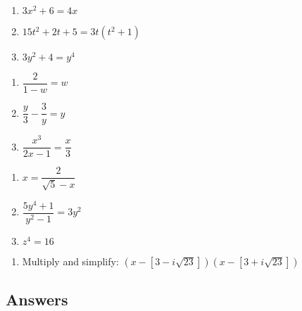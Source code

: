 \documentclass{ximera}
\begin{document}
\begin{multicols}{3}
\begin{enumerate}
\setcounter{enumi}{\value{HW}}

\item $3x^2 + 6 = 4x$ \label{solvecomplexfirst}
\item  $15t^2+2t+5= 3t(t^2+1)$
\item  $3y^2 + 4 = y^4$

\setcounter{HW}{\value{enumi}}
\end{enumerate}
\end{multicols}
\begin{multicols}{3}
\begin{enumerate}
\setcounter{enumi}{\value{HW}}

\item $\dfrac{2}{1-w}= w$ 
\item $\dfrac{y}{3} - \dfrac{3}{y} = y$ 
\item $\dfrac{x^3}{2x-1} = \dfrac{x}{3}$ 

\setcounter{HW}{\value{enumi}}
\end{enumerate}
\end{multicols}

\begin{multicols}{3}
\begin{enumerate}
\setcounter{enumi}{\value{HW}}

\item  $x =\dfrac{2}{\sqrt{5} - x}$
\item  $\dfrac{5y^4 + 1}{y^2-1} = 3y^2$
\item  $z^{4} = 16$  \label{solvecomplexlast}

\setcounter{HW}{\value{enumi}}
\end{enumerate}
\end{multicols}


\begin{enumerate}
\setcounter{enumi}{\value{HW}}

\item  Multiply and simplify:  $\left(x - [3 - i\sqrt{23}]\right)\left(x - [3+i\sqrt{23}]\right)$

\end{enumerate}


\newpage

\subsection{Answers}
\end{document}
